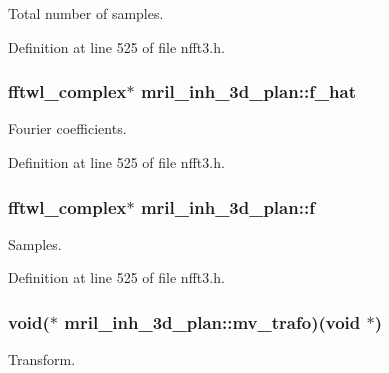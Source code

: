 Total number of samples. 



Definition at line 525 of file nfft3.\-h.

\hypertarget{structmril__inh__3d__plan_ae1f94471fa54c0a172ede3345d0a9a9c}{
\subsubsection[{f\-\_\-hat}]{\setlength{\rightskip}{0pt plus 5cm}fftwl\-\_\-complex$\ast$ mril\-\_\-inh\-\_\-3d\-\_\-plan\-::f\-\_\-hat}}\label{structmril__inh__3d__plan_ae1f94471fa54c0a172ede3345d0a9a9c}


Fourier coefficients. 



Definition at line 525 of file nfft3.\-h.

\hypertarget{structmril__inh__3d__plan_adb03497106fd0a995b70010f9cd9684b}{
\subsubsection[{f}]{\setlength{\rightskip}{0pt plus 5cm}fftwl\-\_\-complex$\ast$ mril\-\_\-inh\-\_\-3d\-\_\-plan\-::f}}\label{structmril__inh__3d__plan_adb03497106fd0a995b70010f9cd9684b}


Samples. 



Definition at line 525 of file nfft3.\-h.

\hypertarget{structmril__inh__3d__plan_a61eec020c68a2b36cff4acb6dd4dcf96}{
\subsubsection[{mv\-\_\-trafo}]{\setlength{\rightskip}{0pt plus 5cm}void($\ast$ mril\-\_\-inh\-\_\-3d\-\_\-plan\-::mv\-\_\-trafo)(void $\ast$)}}\label{structmril__inh__3d__plan_a61eec020c68a2b36cff4acb6dd4dcf96}


Transform. 



